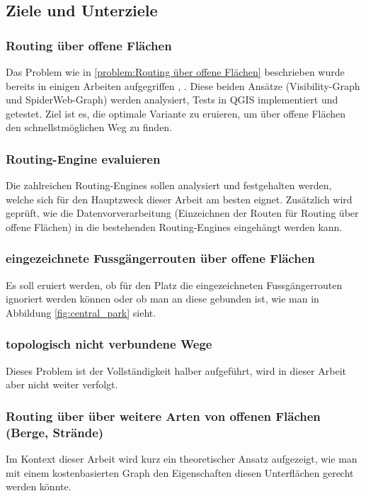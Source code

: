 \subsection{Ziele und Unterziele}
\label{Ziele und Unterziele}

\subsubsection{Routing über offene Flächen}
\label{target:Routing über offene Flächen}
Das Problem wie in \ref{problem:Routing über offene Flächen} beschrieben wurde bereits in einigen Arbeiten aufgegriffen \cite{graser_visibility_graph}, \cite{dzafic_spider_web_graph}. Diese beiden Ansätze (Visibility-Graph und SpiderWeb-Graph) werden analysiert, Tests in QGIS implementiert und getestet. Ziel ist es, die optimale Variante zu eruieren, um über offene Flächen den schnellstmöglichen Weg zu finden.

\subsubsection{Routing-Engine evaluieren}
\label{target:Routing-Enginge evaluieren}
Die zahlreichen Routing-Engines sollen analysiert und festgehalten werden, welche sich für den Hauptzweck dieser Arbeit am besten eignet. Zusätzlich wird geprüft, wie die Datenvorverarbeitung (Einzeichnen der Routen für Routing über offene Flächen) in die bestehenden Routing-Engines eingehängt werden kann.

\subsubsection{eingezeichnete Fussgängerrouten über offene Flächen}
\label{target:eingezeichnete Fussgängerrouten über offene Flächen}
Es soll eruiert werden, ob für den Platz die eingezeichneten Fussgängerrouten ignoriert werden können oder ob man an diese gebunden ist, wie man in Abbildung \ref{fig:central_park} sieht.

\subsubsection{topologisch nicht verbundene Wege}
\label{target:topologisch nicht verbundene Wege}
Dieses Problem ist der Vollständigkeit halber aufgeführt, wird in dieser Arbeit aber nicht weiter verfolgt.

\subsubsection{Routing über über weitere Arten von offenen Flächen (Berge, Strände)}
\label{target:Routing über über weitere Arten von offenen Flächen (Berge, Strände)}
Im Kontext dieser Arbeit wird kurz ein theoretischer Ansatz aufgezeigt, wie man mit einem kostenbasierten Graph den Eigenschaften diesen Unterflächen gerecht werden könnte.

